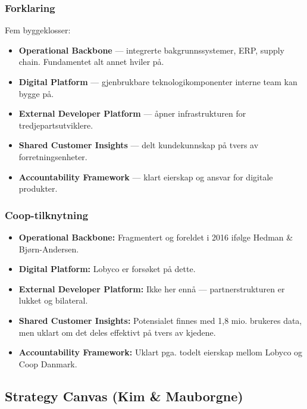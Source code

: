 \subsubsection*{Forklaring}
Fem byggeklosser:
\begin{itemize}
  \item \textbf{Operational Backbone} --- integrerte bakgrunnssystemer,
    ERP, supply chain. Fundamentet alt annet hviler på.
  \item \textbf{Digital Platform} --- gjenbrukbare teknologikomponenter
    interne team kan bygge på.
  \item \textbf{External Developer Platform} --- åpner infrastrukturen
    for tredjepartsutviklere.
  \item \textbf{Shared Customer Insights} --- delt kundekunnskap på
    tvers av forretningsenheter.
  \item \textbf{Accountability Framework} --- klart eierskap og ansvar
    for digitale produkter.
\end{itemize}

\subsubsection*{Coop-tilknytning}
\begin{itemize}
  \item \textbf{Operational Backbone:} Fragmentert og foreldet i 2016
    ifølge Hedman \& Bjørn-Andersen.
  \item \textbf{Digital Platform:} Lobyco er forsøket på dette.
  \item \textbf{External Developer Platform:} Ikke her ennå ---
    partnerstrukturen er lukket og bilateral.
  \item \textbf{Shared Customer Insights:} Potensialet finnes med 1,8
    mio. brukeres data, men uklart om det deles effektivt på tvers av
    kjedene.
  \item \textbf{Accountability Framework:} Uklart pga. todelt eierskap
    mellom Lobyco og Coop Danmark.
\end{itemize}

\subsection{Strategy Canvas (Kim \& Mauborgne)}
\label{model:strategy-canvas}

